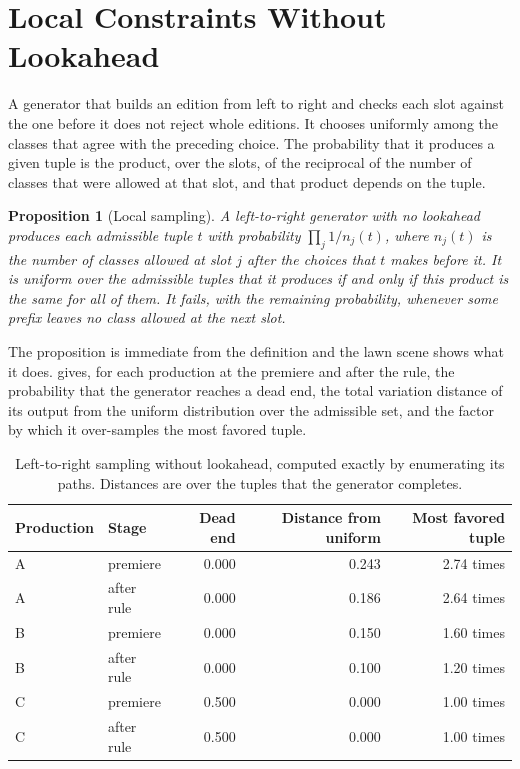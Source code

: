 \documentclass[11pt,twoside,openright]{book}
\theoremstyle{plain}
\newtheorem{proposition}[theorem]{Proposition}
\theoremstyle{definition}
\theoremstyle{remark}
\begin{document}
\section{Local Constraints Without Lookahead}\label{sec:local16}

A generator that builds an edition from left to right and checks each slot against the one before it does not reject whole editions. It chooses uniformly among the classes that agree with the preceding choice. The probability that it produces a given tuple is the product, over the slots, of the reciprocal of the number of classes that were allowed at that slot, and that product depends on the tuple.

\begin{proposition}[Local sampling]\label{prop:local16}
A left-to-right generator with no lookahead produces each admissible tuple $t$ with probability $\prod_j1/n_j(t)$, where $n_j(t)$ is the number of classes allowed at slot $j$ after the choices that $t$ makes before it. It is uniform over the admissible tuples that it produces if and only if this product is the same for all of them. It fails, with the remaining probability, whenever some prefix leaves no class allowed at the next slot.
\end{proposition}

The proposition is immediate from the definition and the lawn scene shows what it does.  gives, for each production at the premiere and after the rule, the probability that the generator reaches a dead end, the total variation distance of its output from the uniform distribution over the admissible set, and the factor by which it over-samples the most favored tuple.

\begin{table}[ht]
\centering
\begin{tabular}{@{}llrrr@{}}
\toprule
Production & Stage & Dead end & Distance from uniform & Most favored tuple\\
\midrule
A & premiere & 0.000 & 0.243 & 2.74 times\\
A & after rule & 0.000 & 0.186 & 2.64 times\\
B & premiere & 0.000 & 0.150 & 1.60 times\\
B & after rule & 0.000 & 0.100 & 1.20 times\\
C & premiere & 0.500 & 0.000 & 1.00 times\\
C & after rule & 0.500 & 0.000 & 1.00 times\\
\bottomrule
\end{tabular}
\caption{Left-to-right sampling without lookahead, computed exactly by enumerating its paths. Distances are over the tuples that the generator completes.}\label{tab:local16}
\end{table}
\end{document}

